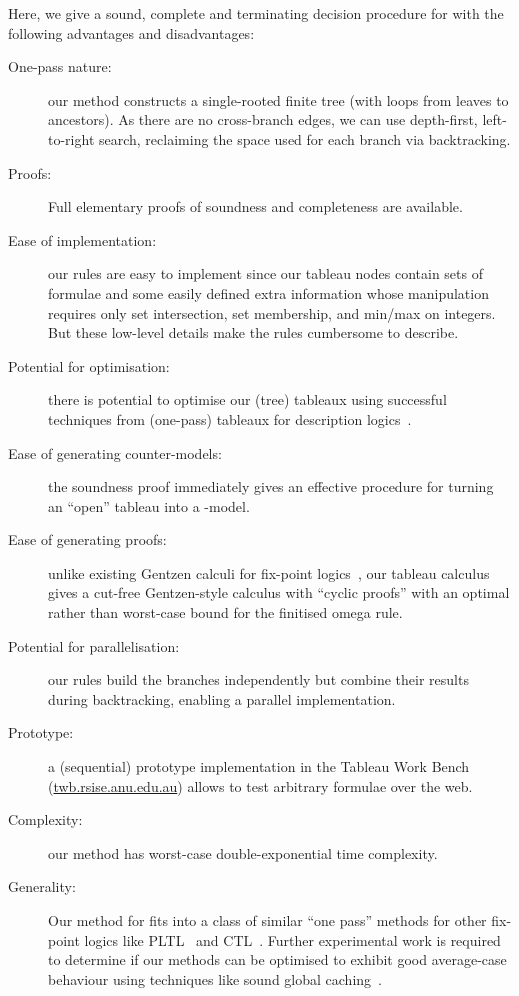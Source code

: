 \documentclass{entcs}
\newcommand{\pdl}{}
\begin{document}
Here, we give a sound, complete and terminating decision procedure for \pdl{}
with the following advantages and disadvantages:
\begin{description}
\item[\rm One-pass nature:] our method constructs a single-rooted finite tree
  (with loops from leaves to ancestors).
  As there are no cross-branch edges, 
  we can use depth-first, left-to-right search,
  reclaiming the space used for each branch via backtracking.
\item[\rm Proofs:] Full elementary proofs of soundness and completeness are available.
\item[\rm Ease of implementation:] our rules are easy to implement
  since our tableau nodes contain sets of formulae
  and some easily defined extra information
  whose manipulation requires only set intersection, set membership,
  and min/max on integers.
  But these low-level details make the rules cumbersome to describe.
\item[\rm Potential for optimisation:] there is potential
  to optimise our (tree) tableaux
  using successful techniques from (one-pass) tableaux
  for description logics~\cite{horrocks-patel-schneider-optimising-description-logic}.
\item[\rm Ease of generating counter-models:] the soundness proof immediately gives
  an effective procedure for turning an ``open'' tableau into a \pdl{}-model.
\item[\rm Ease of generating proofs:] unlike existing Gentzen calculi
  for fix-point logics~\cite{alberucci-jaeger-lck,kretz-studer-jaeger-lck-cut-free},
  our tableau calculus gives a cut-free Gentzen-style calculus
  with ``cyclic proofs'' with an optimal rather than worst-case bound
  for the finitised omega rule.
\item[\rm Potential for parallelisation:] our rules build the branches independently
  but combine their results during backtracking,
  enabling a parallel implementation.
\item[\rm Prototype:] a (sequential) prototype implementation
  in the Tableau Work Bench
  (\url{twb.rsise.anu.edu.au})
  allows to test arbitrary \pdl{} formulae over the web.
\item[\rm Complexity:] our method has worst-case double-exponential time complexity.
\item[\rm Generality:] Our method for \pdl{}
  fits into a class of similar ``one pass'' methods
  for other fix-point logics like
  PLTL~\cite{schwendimann-one-pass} and
  CTL~\cite{abate-gore-widmann-onepass-ctl-lpar}. 
  Further experimental work is required to determine
  if our methods can be optimised to exhibit good average-case behaviour
  using techniques like sound global caching~\cite{gore-nguyen-exptime-alc}.
\end{description}
\end{document}
